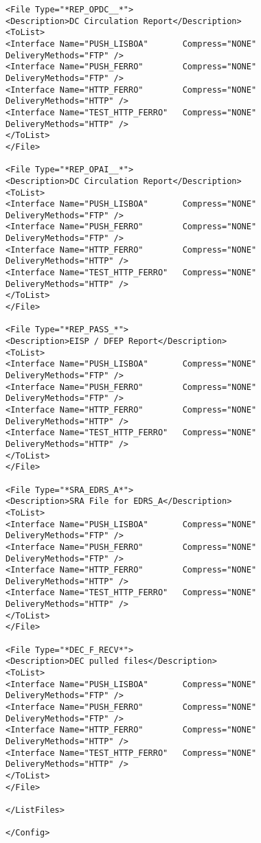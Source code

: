 \documentclass[dec_sum_main.tex]{subfiles}
\begin{document}
\begin{Verbatim}
<File Type="*REP_OPDC__*">
<Description>DC Circulation Report</Description>
<ToList>
<Interface Name="PUSH_LISBOA"       Compress="NONE"   DeliveryMethods="FTP" />
<Interface Name="PUSH_FERRO"        Compress="NONE"   DeliveryMethods="FTP" />
<Interface Name="HTTP_FERRO"        Compress="NONE"   DeliveryMethods="HTTP" />
<Interface Name="TEST_HTTP_FERRO"   Compress="NONE"   DeliveryMethods="HTTP" />
</ToList>
</File>

<File Type="*REP_OPAI__*">
<Description>DC Circulation Report</Description>
<ToList>
<Interface Name="PUSH_LISBOA"       Compress="NONE"   DeliveryMethods="FTP" />
<Interface Name="PUSH_FERRO"        Compress="NONE"   DeliveryMethods="FTP" />
<Interface Name="HTTP_FERRO"        Compress="NONE"   DeliveryMethods="HTTP" />
<Interface Name="TEST_HTTP_FERRO"   Compress="NONE"   DeliveryMethods="HTTP" />
</ToList>
</File>

<File Type="*REP_PASS_*">
<Description>EISP / DFEP Report</Description>
<ToList>
<Interface Name="PUSH_LISBOA"       Compress="NONE"   DeliveryMethods="FTP" />
<Interface Name="PUSH_FERRO"        Compress="NONE"   DeliveryMethods="FTP" />
<Interface Name="HTTP_FERRO"        Compress="NONE"   DeliveryMethods="HTTP" />
<Interface Name="TEST_HTTP_FERRO"   Compress="NONE"   DeliveryMethods="HTTP" />
</ToList>
</File>

<File Type="*SRA_EDRS_A*">
<Description>SRA File for EDRS_A</Description>
<ToList>
<Interface Name="PUSH_LISBOA"       Compress="NONE"   DeliveryMethods="FTP" />
<Interface Name="PUSH_FERRO"        Compress="NONE"   DeliveryMethods="FTP" />
<Interface Name="HTTP_FERRO"        Compress="NONE"   DeliveryMethods="HTTP" />
<Interface Name="TEST_HTTP_FERRO"   Compress="NONE"   DeliveryMethods="HTTP" />
</ToList>
</File>

<File Type="*DEC_F_RECV*">
<Description>DEC pulled files</Description>
<ToList>
<Interface Name="PUSH_LISBOA"       Compress="NONE"   DeliveryMethods="FTP" />
<Interface Name="PUSH_FERRO"        Compress="NONE"   DeliveryMethods="FTP" />
<Interface Name="HTTP_FERRO"        Compress="NONE"   DeliveryMethods="HTTP" />
<Interface Name="TEST_HTTP_FERRO"   Compress="NONE"   DeliveryMethods="HTTP" />
</ToList>
</File>

</ListFiles>

</Config>

\end{Verbatim}
\end{document}
